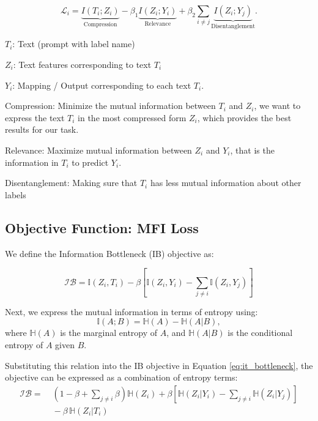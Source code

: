 
\[
\mathcal{L}_i = \underbrace{I(T_i; Z_i)}_{\text{Compression}} - \beta_1 \underbrace{I(Z_i; Y_i)}_{\text{Relevance}} + \beta_2 \sum_{i \neq j} \underbrace{I(Z_i; Y_j)}_{\text{Disentanglement}}.
\]

$T_i$: Text (prompt with label name)

$Z_i$: Text features corresponding to text $T_i$

$Y_i$: Mapping / Output corresponding to each text $T_i$. 


Compression: Minimize the mutual information between $T_i$ and $Z_i$, we want to express the text $T_i$ in the most compressed form $Z_i$, which provides the best results for our task. 

Relevance: Maximize mutual information between $Z_i$ and $Y_i$, that is the information in $T_i$ to predict $Y_i$. 

Disentanglement: Making sure that $T_i$ has less mutual information about other labels







\subsection*{Objective Function: MFI Loss}
\label{Supp:info-bottleneck}
We define the Information Bottleneck (IB) objective as:

\begin{equation} \mathcal{IB} = \mathbb{I}(Z_i, T_i) - \beta \left[\mathbb{I}(Z_i, Y_i) - \sum_{j \neq i} \mathbb{I}(Z_i, Y_j) \right]
\label{eq:it_bottleneck} \end{equation}



Next, we express the mutual information in terms of entropy using:
\begin{equation} \mathbb{I}(A; B) = \mathbb{H}(A) - \mathbb{H}(A | B),
\label{eq:mutual_info} \end{equation}
where $\mathbb{H}(A)$ is the marginal entropy of $A$, and $\mathbb{H}(A|B)$ is the conditional entropy of $A$ given $B$.

Substituting this relation into the IB objective in Equation \ref{eq:it_bottleneck}, the objective can be expressed as a combination of entropy terms:
\begin{align}
\mathcal{IB} = &\; (1 - \beta + \sum_{j \neq i} \beta) \mathbb{H}(Z_i) + \beta \left[ \mathbb{H}(Z_i | Y_i) - \sum_{j \neq i}\mathbb{H}(Z_i | Y_j) \right] \nonumber \\
&\; - \beta \, \mathbb{H}(Z_i | T_i)
\label{eq:entropy_form}
\end{align}

